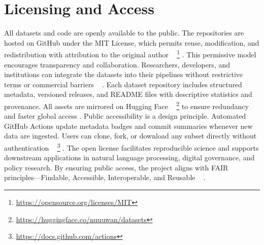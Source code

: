 \documentclass[10pt,a4paper]{article}%
\begin{document}
%
\section{Licensing and Access}%
\label{sec:LicensingandAccess}%
All datasets and code are openly available to the public. The repositories are hosted on GitHub under the MIT License, which permits reuse, modification, and redistribution with attribution to the original author%
~%
\footnote{\href{https://opensource.org/licenses/MIT}{https://opensource.org/licenses/MIT}}%
.%
This permissive model encourages transparency and collaboration. Researchers, developers, and institutions can integrate the datasets into their pipelines without restrictive terms or commercial barriers%
~%
\citep{OpenDataPractices2020}%
.%
Each dataset repository includes structured metadata, versioned releases, and README files with descriptive statistics and provenance. All assets are mirrored on Hugging Face%
~%
\footnote{\href{https://huggingface.co/nuuuwan/datasets}{https://huggingface.co/nuuuwan/datasets}}%
to ensure redundancy and faster global access .%
Public accessibility is a design principle. Automated GitHub Actions update metadata badges and commit summaries whenever new data are ingested. Users can clone, fork, or download any subset directly without authentication%
~%
\footnote{\href{https://docs.github.com/actions}{https://docs.github.com/actions}}%
.%
The open license facilitates reproducible science and supports downstream applications in natural language processing, digital governance, and policy research. By ensuring public access, the project aligns with FAIR principles—Findable, Accessible, Interoperable, and Reusable%
~%
\citep{FAIRPrinciples2016}%
.

%
\end{document}

